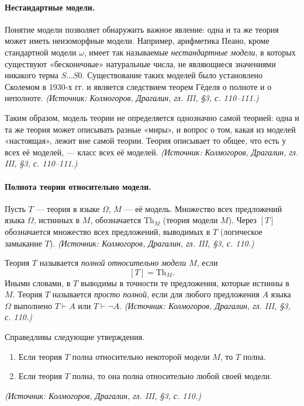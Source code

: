 \documentclass[a4paper,12pt]{article}
\begin{document}
\paragraph{Нестандартные модели.} Понятие модели позволяет обнаружить важное явление: одна и та же теория может иметь неизоморфные модели. Например, арифметика Пеано, кроме стандартной модели \(\omega\), имеет так называемые \emph{нестандартные модели}, в которых существуют «бесконечные» натуральные числа, не являющиеся значениями никакого терма \(S\ldots S0\). Существование таких моделей было установлено Сколемом в 1930-х гг. и является следствием теорем Гёделя о полноте и о неполноте.
\textit{(Источник: Колмогоров, Драгалин, гл. III, §3, с. 110--111.)}

Таким образом, модель теории не определяется однозначно самой теорией: одна и та же теория может описывать разные «миры», и вопрос о том, какая из моделей «настоящая», лежит вне самой теории. Теория описывает то общее, что есть у всех её моделей, --- класс всех её моделей.
\textit{(Источник: Колмогоров, Драгалин, гл. III, §3, с. 110--111.)}

\paragraph{Полнота теории относительно модели.} Пусть \(T\) --- теория в языке \(\Omega\), \(M\) --- её модель. Множество всех предложений языка \(\Omega\), истинных в \(M\), обозначается \(\mathrm{Th}_M\) (теория модели \(M\)). Через \([T]\) обозначается множество всех предложений, выводимых в \(T\) (логическое замыкание \(T\)).
\textit{(Источник: Колмогоров, Драгалин, гл. III, §3, с. 110.)}

Теория \(T\) называется \emph{полной относительно модели \(M\)}, если
\[
[T]=\mathrm{Th}_M.
\]
Иными словами, в \(T\) выводимы в точности те предложения, которые истинны в \(M\). Теория \(T\) называется \emph{просто полной}, если для любого предложения \(A\) языка \(\Omega\) выполнено \(T\vdash A\) или \(T\vdash\neg A\).
\textit{(Источник: Колмогоров, Драгалин, гл. III, §3, с. 110.)}

Справедливы следующие утверждения.
\begin{enumerate}[label=\arabic*)]
\item Если теория \(T\) полна относительно некоторой модели \(M\), то \(T\) полна.
\item Если теория \(T\) полна, то она полна относительно любой своей модели.
\end{enumerate}
\textit{(Источник: Колмогоров, Драгалин, гл. III, §3, с. 110.)}
\end{document}
